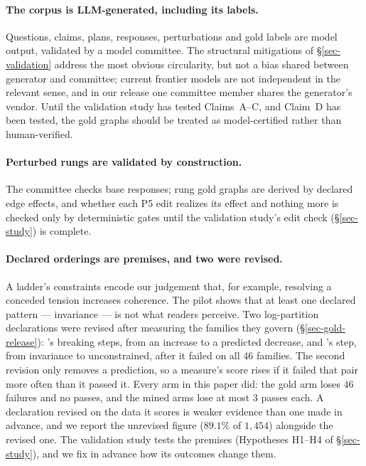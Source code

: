 \paragraph{The corpus is LLM-generated, including its labels.} Questions, claims, plans, responses, perturbations and
gold labels are model output, validated by a model committee. The structural mitigations of \S\ref{sec-validation}
address the most obvious circularity, but not a bias shared between generator and committee; current frontier
models are not independent in the relevant sense, and in our release one committee member shares the generator's
vendor. Until the validation study has tested Claims~A--C, and Claim~D has been tested, the gold graphs should be treated as model-certified rather than
human-verified.

\paragraph{Perturbed rungs are validated by construction.} The committee checks base responses; rung gold graphs are
derived by declared edge effects, and whether each P5 edit realizes its effect and nothing more is checked only by
deterministic gates until the validation study's edit check (\S\ref{sec-study}) is complete.

\paragraph{Declared orderings are premises, and two were revised.} A ladder's constraints encode our judgement
that, for example, resolving a conceded tension increases coherence. The pilot shows that at least one
declared pattern ---  invariance --- is not what readers perceive. Two log-partition
declarations were revised after measuring the families they govern (\S\ref{sec-gold-release}): 's
breaking steps, from an increase to a predicted decrease, and 's 
step, from invariance to unconstrained, after it failed on all $46$ families. The
second revision only removes a prediction, so a measure's score rises if it failed that pair more often than it
passed it. Every arm in this paper did: the gold arm loses $46$ failures and no passes, and the mined arms lose
at most $3$ passes each. A declaration revised on the data it scores is weaker evidence
than one made in advance, and we report the unrevised figure ($89.1\%$ of $1{,}454$) alongside the revised
one. The validation study tests the premises (Hypotheses H1--H4 of
\S\ref{sec-study}), and we fix in advance how its outcomes change them.

